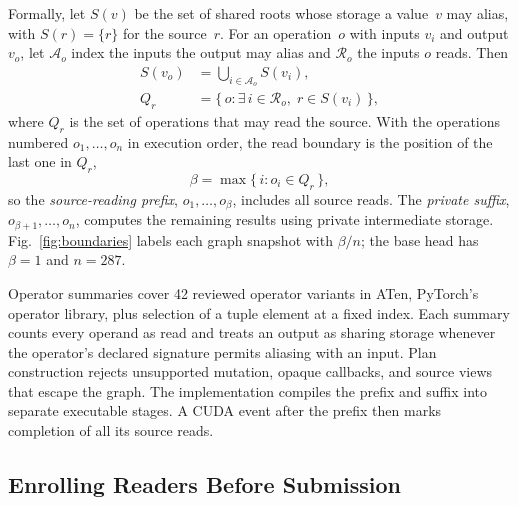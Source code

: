 \documentclass[conference]{IEEEtran}
\begin{document}
Formally, let $S(v)$ be the set of shared roots whose storage a value~$v$ may alias, with $S(r)=\{r\}$ for the source~$r$. For an operation~$o$ with inputs $v_i$ and output $v_o$, let $\mathcal{A}_o$ index the inputs the output may alias and $\mathcal{R}_o$ the inputs $o$ reads. Then
\begin{equation}
\begin{aligned}
S(v_o)&=\textstyle\bigcup_{i\in \mathcal{A}_o} S(v_i),\\
Q_r&=\{\, o : \exists\, i\in \mathcal{R}_o,\; r\in S(v_i) \,\},
\end{aligned}\label{eq:reads}
\end{equation}
where $Q_r$ is the set of operations that may read the source. With the operations numbered $o_1,\dots,o_n$ in execution order, the read boundary is the position of the last one in $Q_r$,
\begin{equation}
\beta=\max\{\, i : o_i\in Q_r \,\}, \label{eq:boundary}
\end{equation}
so the \emph{source-reading prefix}, $o_1,\dots,o_\beta$, includes all source reads. The \emph{private suffix}, $o_{\beta+1},\dots,o_n$, computes the remaining results using private intermediate storage. Fig.~\ref{fig:boundaries} labels each graph snapshot with $\beta/n$; the base head has $\beta=1$ and $n=287$.

Operator summaries cover 42 reviewed operator variants in ATen, PyTorch's operator library, plus selection of a tuple element at a fixed index. Each summary counts every operand as read and treats an output as sharing storage whenever the operator's declared signature permits aliasing with an input. Plan construction rejects unsupported mutation, opaque callbacks, and source views that escape the graph. The implementation compiles the prefix and suffix into separate executable stages. A CUDA event after the prefix then marks completion of all its source reads.

\subsection{Enrolling Readers Before Submission}
\label{sec:enroll}
\end{document}
